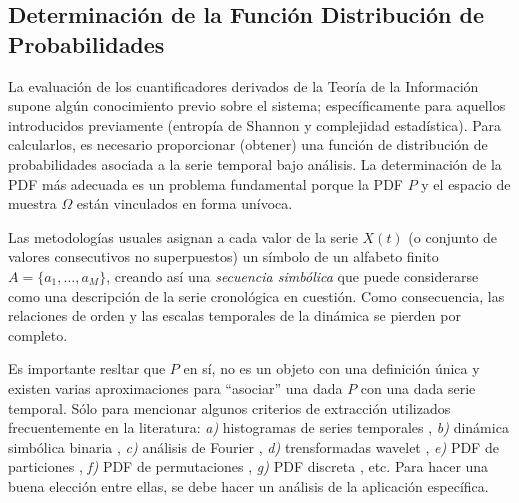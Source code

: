 \subsection{Determinación de la Función Distribución de Probabilidades}

La evaluación de los cuantificadores derivados de la Teoría de la Información supone algún conocimiento previo sobre el sistema; específicamente para aquellos introducidos previamente (entropía de Shannon y complejidad estadística).
Para calcularlos, es necesario proporcionar (obtener) una función de distribución de probabilidades asociada a la serie temporal bajo análisis.
La determinación de la PDF más adecuada es un problema fundamental porque la PDF $P$ y el espacio de muestra $\Omega$ están vinculados en forma unívoca.

Las metodologías usuales asignan a cada valor de la serie $X(t)$ (o conjunto de valores consecutivos no superpuestos) un símbolo de un alfabeto finito $A = \{a_1, \dots, a_M \}$, creando así una {\it secuencia simbólica \/} que puede considerarse como una descripción de la serie cronológica en cuestión.
Como consecuencia, las relaciones de orden y las escalas temporales de la dinámica se pierden por completo.

Es importante resltar que $P$ en sí, no es un objeto con una definición única y existen varias aproximaciones para ``asociar'' una dada $P$ con una dada serie temporal.
Sólo para mencionar algunos criterios de extracción utilizados frecuentemente en la literatura: {\it a)\/} histogramas de series temporales \cite{Martin2004}, {\it b)\/} dinámica simbólica binaria \cite{Mischaikow1999}, {\it c)\/} análisis de Fourier \cite{Powell1979}, {\it d)\/} trensformadas wavelet \cite{Blanco1998,Rosso2001}, {\it e)\/} PDF de particiones \cite{Ebeling2001}, {\it f)\/} PDF de permutaciones \cite{Pompe2002,Keller2005}, {\it g)\/} PDF discreta \cite{Amigo2007}, etc.
Para hacer una buena elección entre ellas, se debe hacer un análisis de la aplicación específica.

